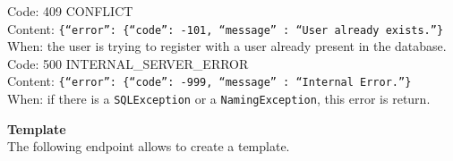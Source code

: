 \begin{itemize}
    Code: 409 CONFLICT\\
    Content: \texttt{\{``error'': \{``code'': -101, ``message'' : ``User already exists.''\}}\\
    When: the user is trying to register with a user already present in the database.\\

    Code: 500 INTERNAL\_SERVER\_ERROR\\
    Content: \texttt{\{``error'': \{``code'': -999, ``message'' : ``Internal Error.''\}}\\
    When: if there is a \texttt{SQLException} or a \texttt{NamingException}, this error is return.\\
    
\end{itemize}


\noindent\textbf{Template}\\
The following endpoint allows to create a template.

